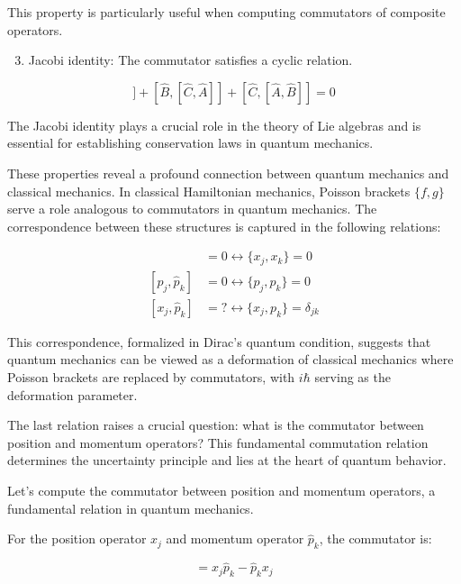 \documentclass[italian]{HKNdocument}
\begin{document}
This property is particularly useful when computing commutators of composite operators.

\begin{enumerate}
  \setcounter{enumi}{2}
  \item Jacobi identity: The commutator satisfies a cyclic relation.
\end{enumerate}

\begin{equation}
[\hat{A},[\hat{B}, \hat{C}]] + [\hat{B},[\hat{C}, \hat{A}]] + [\hat{C},[\hat{A}, \hat{B}]] = 0 \label{eq:1.55}
\end{equation}

The Jacobi identity plays a crucial role in the theory of Lie algebras and is essential for establishing conservation laws in quantum mechanics.

These properties reveal a profound connection between quantum mechanics and classical mechanics. In classical Hamiltonian mechanics, Poisson brackets $\{f,g\}$ serve a role analogous to commutators in quantum mechanics. The correspondence between these structures is captured in the following relations:

\begin{align}
[x_{j}, x_{k}] &= 0 \longleftrightarrow \{x_{j}, x_{k}\} = 0 \\
[\hat{p}_{j}, \hat{p}_{k}] &= 0 \longleftrightarrow \{p_{j}, p_{k}\} = 0 \label{eq:1.56} \\
[x_{j}, \hat{p}_{k}] &= ? \longleftrightarrow \{x_{j}, p_{k}\} = \delta_{j k}
\end{align}

This correspondence, formalized in Dirac's quantum condition, suggests that quantum mechanics can be viewed as a deformation of classical mechanics where Poisson brackets are replaced by commutators, with $i\hbar$ serving as the deformation parameter.

The last relation raises a crucial question: what is the commutator between position and momentum operators? This fundamental commutation relation determines the uncertainty principle and lies at the heart of quantum behavior.


Let's compute the commutator between position and momentum operators, a fundamental relation in quantum mechanics.

For the position operator $x_j$ and momentum operator $\hat{p}_k$, the commutator is:

\begin{equation}
[x_j, \hat{p}_k] = x_j\hat{p}_k - \hat{p}_k x_j \label{eq:1.57}
\end{equation}
\end{document}
